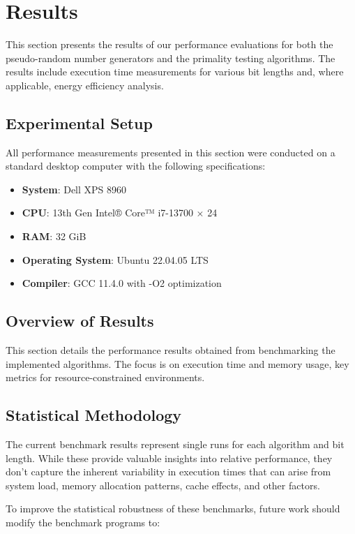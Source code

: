 \section{Results}
\label{sec:results}

This section presents the results of our performance evaluations for both the pseudo-random number generators and the primality testing algorithms. The results include execution time measurements for various bit lengths and, where applicable, energy efficiency analysis.

\subsection{Experimental Setup}

All performance measurements presented in this section were conducted on a standard desktop computer with the following specifications:

\begin{itemize}
    \item \textbf{System}: Dell XPS 8960
    \item \textbf{CPU}: 13th Gen Intel® Core™ i7-13700 × 24
    \item \textbf{RAM}: 32 GiB
    \item \textbf{Operating System}: Ubuntu 22.04.05 LTS
    \item \textbf{Compiler}: GCC 11.4.0 with -O2 optimization
\end{itemize}


\subsection{Overview of Results}
This section details the performance results obtained from benchmarking the implemented algorithms. The focus is on execution time and memory usage, key metrics for resource-constrained environments.

\subsection{Statistical Methodology}

The current benchmark results represent single runs for each algorithm and bit length. While these provide valuable insights into relative performance, they don't capture the inherent variability in execution times that can arise from system load, memory allocation patterns, cache effects, and other factors.

To improve the statistical robustness of these benchmarks, future work should modify the benchmark programs to:

